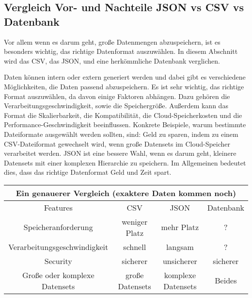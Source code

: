 \subsection{Vergleich Vor- und Nachteile JSON vs CSV vs Datenbank}
Vor allem wenn es darum geht, große Datenmengen abzuspeichern, ist es besonders wichtig, das richtige Datenformat auszuwählen. In diesem Abschnitt wird das CSV, das JSON, und eine herkömmliche Datenbank verglichen. 

Daten können intern oder extern generiert werden und dabei gibt es verschiedene Möglichkeiten, die Daten passend abzuspeichern. Es ist sehr wichtig, das richtige Format auszuwählen, da davon einige Faktoren abhängen. Dazu gehören die Verarbeitungsgeschwindigkeit, sowie die Speichergröße. 
Außerdem kann das Format die Skalierbarkeit, die Kompatibilität, die Cloud-Speicherkosten und die Performance-Geschwindigkeit beeinflussen. 
Konkrete Beispiele, warum bestimmte Dateiformate ausgewählt werden sollten, sind: Geld zu sparen, indem zu einem CSV-Dateiformat gewechselt wird, wenn große Datensets im Cloud-Speicher verarbeitet werden. JSON ist eine bessere Wahl, wenn es darum geht, kleinere Datensets mit einer komplexen Hierarchie zu speichern. 
Im Allgemeinen bedeutet dies, dass das richtige Datenformat Geld und Zeit spart.  

\begin{center}
    \begin{tabular}{ |c|c|c|c| } 
     \hline
     \multicolumn{4}{|c|}{Ein genauerer Vergleich (exaktere Daten kommen noch) } \\
     \hline
     \hline
     Features & CSV & JSON & Datenbank \\ 
     \hline 
     \hline
     Speicheranforderung & weniger Platz & mehr Platz & ? \\ 
     \hline
     Verarbeitungsgeschwindigkeit & schnell & langsam & ? \\ 
     \hline
     Security & sicherer & unsicherer & sicherer \\ 
     \hline
     Große oder komplexe Datensets & große Datensets & komplexe Datensets & Beides \\ 
     \hline
    \end{tabular} 
    \end{center}

